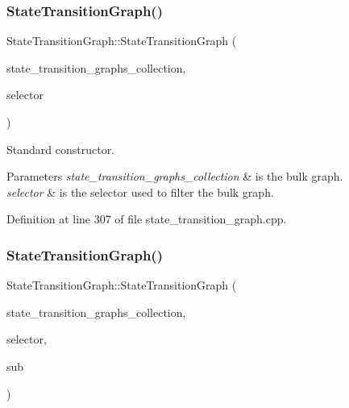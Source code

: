 \subsubsection{\texorpdfstring{State\+Transition\+Graph()}{StateTransitionGraph()}\hspace{0.1cm}{\footnotesize\ttfamily [1/2]}}
{\footnotesize\ttfamily State\+Transition\+Graph\+::\+State\+Transition\+Graph (\begin{DoxyParamCaption}\item[{const \hyperlink{state__transition__graph_8hpp_a2613a37dfdde13c61d36bfaba91f433e}{State\+Transition\+Graphs\+Collection\+Ref}}]{state\+\_\+transition\+\_\+graphs\+\_\+collection,  }\item[{int}]{selector }\end{DoxyParamCaption})}



Standard constructor. 


\begin{DoxyParams}{Parameters}
{\em state\+\_\+transition\+\_\+graphs\+\_\+collection} & is the bulk graph. \\
\hline
{\em selector} & is the selector used to filter the bulk graph. \\
\hline
\end{DoxyParams}


Definition at line 307 of file state\+\_\+transition\+\_\+graph.\+cpp.

\mbox{\label{structStateTransitionGraph_a3d68a50a1db1f5d01e3c24564f9f9d9f}} 
\subsubsection{\texorpdfstring{State\+Transition\+Graph()}{StateTransitionGraph()}\hspace{0.1cm}{\footnotesize\ttfamily [2/2]}}
{\footnotesize\ttfamily State\+Transition\+Graph\+::\+State\+Transition\+Graph (\begin{DoxyParamCaption}\item[{const \hyperlink{state__transition__graph_8hpp_a2613a37dfdde13c61d36bfaba91f433e}{State\+Transition\+Graphs\+Collection\+Ref}}]{state\+\_\+transition\+\_\+graphs\+\_\+collection,  }\item[{int}]{selector,  }\item[{\hyperlink{classCustomUnorderedSet}{Custom\+Unordered\+Set}$<$ \hyperlink{graph_8hpp_abefdcf0544e601805af44eca032cca14}{vertex} $>$ \&}]{sub }\end{DoxyParamCaption})}




